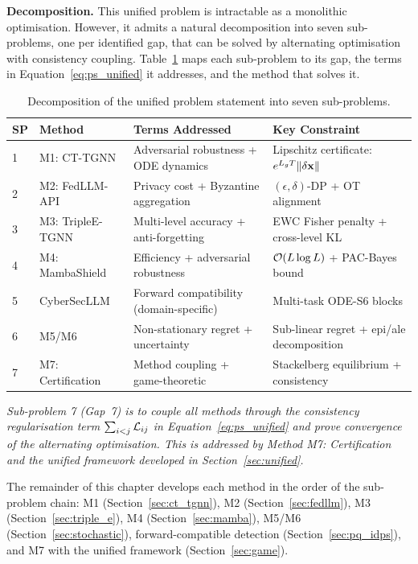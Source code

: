 \noindent\textbf{Decomposition.} This unified problem is intractable as a monolithic optimisation. However, it admits a natural decomposition into seven sub-problems, one per identified gap, that can be solved by alternating optimisation with consistency coupling. Table~\ref{tab:decomposition} maps each sub-problem to its gap, the terms in Equation~\eqref{eq:ps_unified} it addresses, and the method that solves it.

\begin{table}[htbp]
\centering
\caption{Decomposition of the unified problem statement into seven sub-problems.}
\label{tab:decomposition}
\small
\begin{tabular}{p{0.5cm} p{3.0cm} p{4.5cm} p{5.0cm}}
\toprule
\textbf{SP} & \textbf{Method} & \textbf{Terms Addressed} & \textbf{Key Constraint} \\
\midrule
1 & M1: CT-TGNN & Adversarial robustness + ODE dynamics & Lipschitz certificate: $e^{L_gT}\|\delta\mathbf{x}\|$ \\
2 & M2: FedLLM-API & Privacy cost + Byzantine aggregation & $(\epsilon,\delta)$-DP + OT alignment \\
3 & M3: TripleE-TGNN & Multi-level accuracy + anti-forgetting & EWC Fisher penalty + cross-level KL \\
4 & M4: MambaShield & Efficiency + adversarial robustness & $\mathcal{O}(L\log L)$ + PAC-Bayes bound \\
5 & CyberSecLLM & Forward compatibility (domain-specific) & Multi-task ODE-S6 blocks \\
6 & M5/M6 & Non-stationary regret + uncertainty & Sub-linear regret + epi/ale decomposition \\
7 & M7: Certification & Method coupling + game-theoretic & Stackelberg equilibrium + consistency \\
\bottomrule
\end{tabular}
\end{table}

\emph{Sub-problem 7 (Gap~7) is to couple all methods through the consistency regularisation term $\sum_{i<j}\mathcal{L}_{ij}$ in Equation~\eqref{eq:ps_unified} and prove convergence of the alternating optimisation. This is addressed by Method M7: Certification and the unified framework developed in Section~\ref{sec:unified}.}

The remainder of this chapter develops each method in the order of the sub-problem chain: M1 (Section~\ref{sec:ct_tgnn}), M2 (Section~\ref{sec:fedllm}), M3 (Section~\ref{sec:triple_e}), M4 (Section~\ref{sec:mamba}), M5/M6 (Section~\ref{sec:stochastic}), forward-compatible detection (Section~\ref{sec:pq_idps}), and M7 with the unified framework (Section~\ref{sec:game}).



